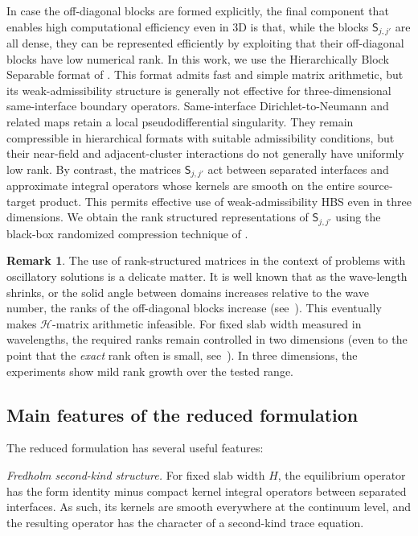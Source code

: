 \documentclass[final,onefignum,onetabnum]{siamart250211}
\newcommand{\mtx}[1]{\bm{\mathsf{#1}}}
\theoremstyle{definition}
\newtheorem{remark}{Remark}
\begin{document}
In case the off-diagonal blocks are formed explicitly, the final component that enables high computational efficiency even in 3D is that, while the blocks $\mtx{S}_{j,j'}$ are all dense, they can be represented efficiently by exploiting that their off-diagonal blocks have low numerical rank. In this work, we use the Hierarchically Block Separable format of \cite{2012_martinsson_FDS_survey}. This format admits fast and simple matrix arithmetic, but its weak-admissibility structure is generally not effective for three-dimensional same-interface boundary operators. Same-interface Dirichlet-to-Neumann and related maps retain a local pseudodifferential singularity. They remain compressible in hierarchical formats with suitable admissibility conditions, but their near-field and adjacent-cluster interactions do not generally have uniformly low rank. By contrast, the matrices $\mtx{S}_{j,j'}$ act between separated interfaces and approximate integral operators whose kernels are smooth on the entire source-target product. This permits effective use of weak-admissibility HBS even in three dimensions. We obtain the rank
structured representations of $\mtx{S}_{j,j'}$ using the black-box randomized
compression technique of \cite{fastHBS}.

\begin{remark}
The use of rank-structured matrices in the context of problems with oscillatory
solutions is a delicate matter. It is well known that as the wave-length shrinks, or the solid angle between domains increases relative to the wave number, the ranks of the off-diagonal blocks increase (see~\cite{Dirckx}). This eventually makes $\mathcal{H}$-matrix arithmetic infeasible. For fixed slab width measured in wavelengths, the required ranks remain controlled in two dimensions (even to the point that the \textit{exact} rank often is small, see~\cite[Ch.~21]{2019_martinsson_fast_direct_solvers}). In three dimensions, the experiments show mild rank growth over the tested range.
\end{remark}



\subsection{Main features of the reduced formulation}
The reduced formulation has several useful features:

\textit{Fredholm second-kind structure.}
For fixed slab width $H$, the equilibrium operator has the form identity minus compact kernel integral operators between separated interfaces. As such, its kernels are smooth everywhere at the continuum level, and the resulting operator has the character of a second-kind trace equation.
\end{document}
